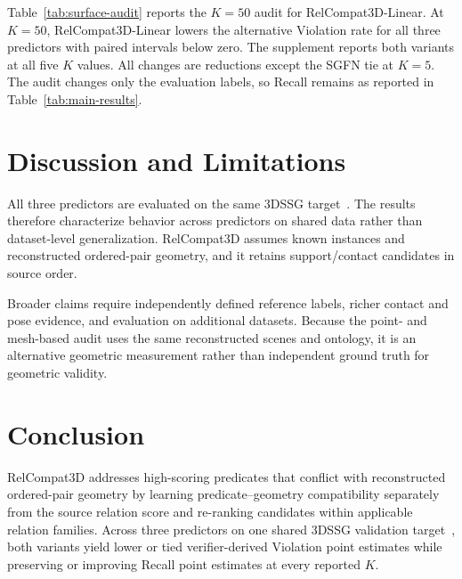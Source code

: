 Table~\ref{tab:surface-audit} reports the $K=50$ audit for RelCompat3D-Linear. At $K=50$, RelCompat3D-Linear lowers the alternative Violation rate for all three predictors with paired intervals below zero. The supplement reports both variants at all five $K$ values. All changes are reductions except the SGFN tie at $K=5$. The audit changes only the evaluation labels, so Recall remains as reported in Table~\ref{tab:main-results}.

\section{Discussion and Limitations}

All three predictors are evaluated on the same 3DSSG target~\cite{wald2020learning}. The results therefore characterize behavior across predictors on shared data rather than dataset-level generalization. RelCompat3D assumes known instances and reconstructed ordered-pair geometry, and it retains support/contact candidates in source order.
 
Broader claims require independently defined reference labels, richer contact and pose evidence, and evaluation on additional datasets. Because the point- and mesh-based audit uses the same reconstructed scenes and ontology, it is an alternative geometric measurement rather than independent ground truth for geometric validity.

\section{Conclusion}

RelCompat3D addresses high-scoring predicates that conflict with reconstructed ordered-pair geometry by learning predicate--geometry compatibility separately from the source relation score and re-ranking candidates within applicable relation families.  
Across three predictors on one shared 3DSSG validation target~\cite{wald2020learning}, both variants yield lower or tied verifier-derived Violation point estimates while preserving or improving Recall point estimates at every reported $K$.
